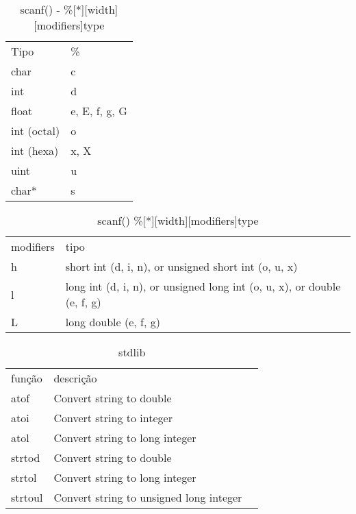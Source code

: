 \documentclass[10pt,twocolumn, a4paper]{article}
\begin{document}
\begin{table}
\begin{tabular}{ll}
Tipo & \% \\ 
char & c \\ 
int & d \\ 
float & e, E, f, g, G \\ 
int (octal) & o \\ 
int (hexa) & x, X \\ 
uint & u \\ 
char* & s
\end{tabular}
\caption{scanf() - \%[*][width][modifiers]type}
\label{tipos}
\end{table}

\begin{table}
 \begin{tabular}{ll}
modifiers & tipo \\ 
h & short int (d, i, n), or unsigned short int (o, u, x) \\ 
l & long int (d, i, n), or unsigned long int (o, u, x), or double (e, f, g) \\ 
L & long double (e, f, g) \\ 
\end{tabular}
\caption{scanf() \%[*][width][modifiers]type}
\label{modifiers}
\end{table}


\begin{table}
 \begin{tabular}{lll}
função & descrição \\
atof & Convert string to double \\
atoi & Convert string to integer \\
atol & Convert string to long integer \\
strtod & Convert string to double \\
strtol & Convert string to long integer \\
strtoul & Convert string to unsigned long integer \\
\end{tabular}
\caption{stdlib}
\label{stdlib functions}
\end{table}
\end{document}
